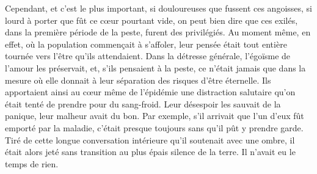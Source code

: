 \documentclass[french,twoside]{book} %
\begin{document}
Cependant, et c’est le plus important, si douloureuses que fussent ces angoisses, si lourd à porter que fût ce cœur pourtant vide, on peut bien dire que ces exilés, dans la première période de la peste, furent des privilégiés. Au moment même, en effet, où la population commençait à s’affoler, leur pensée était tout entière tournée vers l’être qu’ils attendaient. Dans la détresse générale, l’égoïsme de l’amour les préservait, et, s’ils pensaient à la peste, ce n’était jamais que dans la mesure où elle donnait à leur séparation des risques d’être éternelle. Ils apportaient ainsi au cœur même de l’épidémie une distraction salutaire qu’on était tenté de prendre pour du sang-froid. Leur désespoir les sauvait de la panique, leur malheur avait du bon. Par exemple, s’il arrivait que l’un d’eux fût emporté par la maladie, c’était presque toujours sans qu’il pût y prendre garde. Tiré de cette longue conversation intérieure qu’il soutenait avec une ombre, il était alors jeté sans transition au plus épais silence de la terre. Il n’avait eu le temps de rien.
\end{document}
